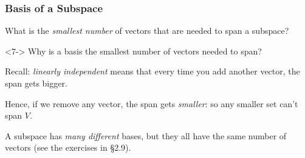 \begin{frame}
\frametitle{Basis of a Subspace}

What is the \emph{smallest number} of vectors that are needed to span a subspace?

\pause\bigskip
{}

\begin{uncoverenv}<7->
\pause[7]\bigskip
\alert{Why} is a basis the smallest number of vectors needed to span?

\pause\medskip
Recall: \emph{linearly independent} means that every time you add another
vector, the span gets bigger.

\pause\medskip
Hence, if we remove any vector, the span gets \emph{smaller\/}: so any smaller set
can't span $V$.

\pause
\begin{bluebox}[Important]{.8\textwidth}
  A subspace has \emph{many different} bases, but they all have the same
  number of vectors (see the exercises in \S2.9).
\end{bluebox}

\end{uncoverenv}

\end{frame}



